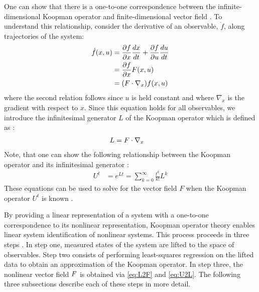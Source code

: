 One can show that there is a one-to-one correspondence between the infinite-dimensional Koopman operator and finite-dimensional vector field .
To understand this relationship, consider the derivative of an observable, $\dot{f}$, along trajectories of the system:
\begin{align}
\dot{f}(x,u) &= \frac{\partial f}{\partial x} \frac{dx}{dt} + \frac{\partial f}{\partial u}\frac{du}{dt} \\
           &= \frac{\partial f}{\partial x} F(x,u) \\
           &= ( F \cdot \nabla_{x} ) f(x,u)
\end{align}
where the second relation follows since $u$ is held constant and where $\nabla_x$ is the gradient with respect to $x$.
Since this equation holds for all observables, we introduce the infinitesimal generator $L$  of the Koopman operator  \cite[Section 7.6]{lasota2013chaos} which is defined as :
\begin{align}
    L &= F \cdot \nabla_{x}
    \label{eq:L2F}
\end{align}
Note, that one can show the following relationship between the Koopman operator and its infinitesimal generator \cite{}:
\begin{align}
    U^t &= e^{L t} = \sum_{k=0}^\infty \frac{t^k}{k!} L^k
    \label{eq:U2L}
\end{align}
These equations can be used to solve for the vector field $F$ when the Koopman operator $U^t$ is known .

By providing a linear representation of a system with a one-to-one correspondence to its nonlinear representation, Koopman operator theory enables linear system identification of nonlinear systems. 
This process proceeds in three steps  .
In step one, measured states of the system are lifted to the space of observables.
Step two consists of performing least-squares regression on the lifted data to obtain an approximation of the Koopman operator.
In step three, the nonlinear vector field $F$ is obtained via \eqref{eq:L2F} and \eqref{eq:U2L}.
The following three subsections describe each of these steps in more detail.


